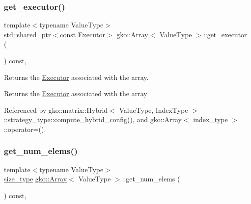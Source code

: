 \mbox{\label{classgko_1_1Array_a820e5930cb5072acc7673fdb2d11efcd}} 
\subsubsection{\texorpdfstring{get\+\_\+executor()}{get\_executor()}}
{\footnotesize\ttfamily template$<$typename Value\+Type$>$ \\
std\+::shared\+\_\+ptr$<$const \hyperlink{classgko_1_1Executor}{Executor}$>$ \hyperlink{classgko_1_1Array}{gko\+::\+Array}$<$ Value\+Type $>$\+::get\+\_\+executor (\begin{DoxyParamCaption}{ }\end{DoxyParamCaption}) const\hspace{0.3cm}{\ttfamily [inline]}, {\ttfamily [noexcept]}}



Returns the \hyperlink{classgko_1_1Executor}{Executor} associated with the array. 

\begin{DoxyReturn}{Returns}
the \hyperlink{classgko_1_1Executor}{Executor} associated with the array 
\end{DoxyReturn}


Referenced by gko\+::matrix\+::\+Hybrid$<$ Value\+Type, Index\+Type $>$\+::strategy\+\_\+type\+::compute\+\_\+hybrid\+\_\+config(), and gko\+::\+Array$<$ index\+\_\+type $>$\+::operator=().

\mbox{\label{classgko_1_1Array_ad4a2aa179d350634e6579f144b6b2cf0}} 
\subsubsection{\texorpdfstring{get\+\_\+num\+\_\+elems()}{get\_num\_elems()}}
{\footnotesize\ttfamily template$<$typename Value\+Type$>$ \\
\hyperlink{namespacegko_a6e5c95df0ae4e47aab2f604a22d98ee7}{size\+\_\+type} \hyperlink{classgko_1_1Array}{gko\+::\+Array}$<$ Value\+Type $>$\+::get\+\_\+num\+\_\+elems (\begin{DoxyParamCaption}{ }\end{DoxyParamCaption}) const\hspace{0.3cm}{\ttfamily [inline]}, {\ttfamily [noexcept]}}



